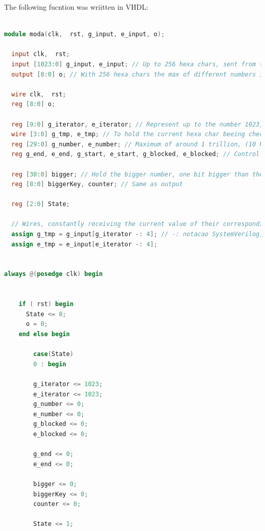 \begin{refsection}
The following fucntion was wriitten in VHDL:

\begin{lstlisting}[caption={moda.vhd}, language=Verilog, captionpos=b]

module moda(clk,  rst, g_input, e_input, o);

  input clk,  rst;
  input [1023:0] g_input, e_input; // Up to 256 hexa chars, sent from the testbench
  output [8:0] o; // With 256 hexa chars the max of different numbers is 512 (256 / 2 (commas) * 4)

  wire clk,  rst;
  reg [8:0] o;

  reg [9:0] g_iterator, e_iterator; // Represent up to the number 1023, to iterate the inputs
  wire [3:0] g_tmp, e_tmp; // To hold the current hexa char beeing checked
  reg [29:0] g_number, e_number; // Maximum of around 1 trillion, (10 hexa digits, because in bcd)
  reg g_end, e_end, g_start, e_start, g_blocked, e_blocked; // Control registers

  reg [30:0] bigger; // Hold the bigger number, one bit bigger than the biggest number for the inputs
  reg [8:0] biggerKey, counter; // Same as output

  reg [2:0] State;

  // Wires, constantly receiving the current value of their corresponding input with the current interator
  assign g_tmp = g_input[g_iterator -: 4]; // -: notacao SystemVerilog, ver se funcioa com yosys
  assign e_tmp = e_input[e_iterator -: 4];


always @(posedge clk) begin

	
    if ( rst) begin
      State <= 0;
      o = 0;
    end else begin

	    case(State)
	    0 : begin

		g_iterator <= 1023;
		e_iterator <= 1023;
		g_number <= 0;
		e_number <= 0;
		g_blocked <= 0;
		e_blocked <= 0;

		g_end <= 0;
		e_end <= 0;

		bigger <= 0;
		biggerKey <= 0;
		counter <= 0;

		State <= 1;


\end{lstlisting}
\end{refsection}
